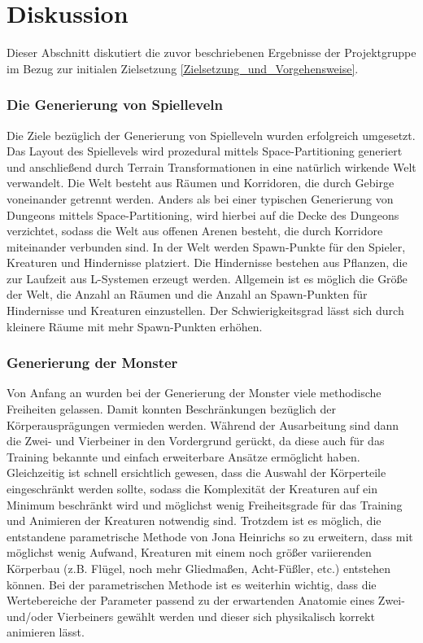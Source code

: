 \section{Diskussion}
\label{Diskussion}

Dieser Abschnitt diskutiert die zuvor beschriebenen Ergebnisse der Projektgruppe im Bezug zur initialen Zielsetzung \ref{Zielsetzung_und_Vorgehensweise}.

\subsubsection{Die Generierung von Spielleveln}
Die Ziele bezüglich der Generierung von Spielleveln wurden erfolgreich umgesetzt.
Das Layout des Spiellevels wird prozedural mittels Space-Partitioning generiert und anschließend durch Terrain Transformationen in eine natürlich wirkende Welt verwandelt.
Die Welt besteht aus Räumen und Korridoren, die durch Gebirge voneinander getrennt werden.
Anders als bei einer typischen Generierung von Dungeons mittels Space-Partitioning, wird hierbei auf die Decke des Dungeons verzichtet, sodass die Welt aus offenen Arenen besteht, die durch Korridore miteinander verbunden sind.
In der Welt werden Spawn-Punkte für den Spieler, Kreaturen und Hindernisse platziert.
Die Hindernisse bestehen aus Pflanzen, die zur Laufzeit aus L-Systemen erzeugt werden.
Allgemein ist es möglich die Größe der Welt, die Anzahl an Räumen und die Anzahl an Spawn-Punkten für Hindernisse und Kreaturen einzustellen.
Der Schwierigkeitsgrad lässt sich durch kleinere Räume mit mehr Spawn-Punkten erhöhen.

\subsubsection{Generierung der Monster}
Von Anfang an wurden bei der Generierung der Monster viele methodische Freiheiten gelassen. Damit konnten Beschränkungen bezüglich der Körperausprägungen vermieden werden. Während der Ausarbeitung sind dann die Zwei- und Vierbeiner in den Vordergrund gerückt, da diese auch für das Training bekannte und einfach erweiterbare Ansätze ermöglicht haben. Gleichzeitig ist schnell ersichtlich gewesen, dass die Auswahl der Körperteile eingeschränkt werden sollte, sodass die Komplexität der Kreaturen auf ein Minimum beschränkt wird und möglichst wenig Freiheitsgrade für das Training und Animieren der Kreaturen notwendig sind. Trotzdem ist es möglich, die entstandene parametrische Methode von Jona Heinrichs so zu erweitern, dass mit möglichst wenig Aufwand, Kreaturen mit einem noch größer variierenden Körperbau (z.B. Flügel, noch mehr Gliedmaßen, Acht-Füßler, etc.) entstehen können. Bei der parametrischen Methode ist es weiterhin wichtig, dass die Wertebereiche der Parameter passend zu der erwartenden Anatomie eines Zwei- und/oder Vierbeiners gewählt werden und dieser sich physikalisch korrekt animieren lässt.

